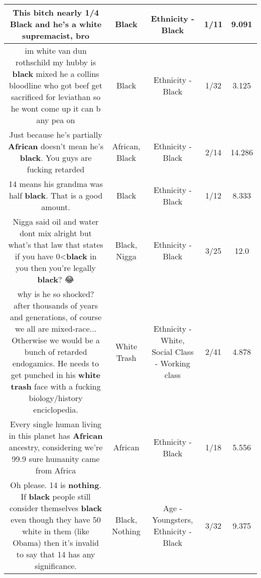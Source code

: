 \documentclass[11pt]{article}
\newlength\mylength
\begin{document}
\begin{center}
\begin{longtable}{|C{.65\mylength}|C{.30\mylength}|C{.12\mylength}|C{.12\mylength}|C{.12\mylength}|}
  \small This bitch nearly 1/4 \textbf{Black} and he's a white supremacist, bro\normalsize   & Black & Ethnicity - Black & 1/11 & 9.091 \\  \hline
  \small im white van dun rothschild my hubby is \textbf{black} mixed he a collins bloodline who got beef get sacrificed for leviathan so he wont come up it can b any pea on\normalsize   & Black & Ethnicity - Black & 1/32 & 3.125 \\  \hline
  \small Just because he's partially \textbf{African} doesn't mean he's \textbf{black}. You guys are fucking retarded\normalsize   & African, Black & Ethnicity - Black & 2/14 & 14.286 \\  \hline
  \small 14 means his grandma was half \textbf{black}. That is a good amount.\normalsize   & Black & Ethnicity - Black & 1/12 & 8.333 \\  \hline
  \small Nigga said oil and water dont mix alright but what's that law that states if you have 0<\textbf{black} in you then you're legally \textbf{black}? 😂\normalsize   & Black, Nigga & Ethnicity - Black & 3/25 & 12.0 \\  \hline
  \small why is he so shocked? after thousands of years and generations, of course we all are mixed-race... Otherwise we would be a bunch of retarded endogamics. He needs to get punched in his \textbf{w\textbf{hite trash}} face with a fucking biology/history enciclopedia.\normalsize   & White Trash & Ethnicity - White, Social Class - Working class & 2/41 & 4.878 \\  \hline
  \small Every single human living in this planet has \textbf{African} ancestry, considering we're 99.9 sure humanity came from Africa\normalsize   & African & Ethnicity - Black & 1/18 & 5.556 \\  \hline
  \small Oh please. 14 is \textbf{nothing}. If \textbf{black} people still consider themselves \textbf{black} even though they have 50 white in them (like Obama) then it's invalid to say that 14 has any significance.\normalsize   & Black, Nothing & Age - Youngsters, Ethnicity - Black & 3/32 & 9.375 \\  \hline

\end{longtable}
\end{center}
\end{document}
